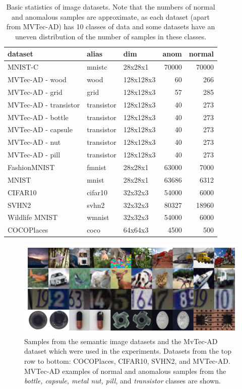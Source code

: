 \begin{table}
    \centering
    \tabcolsep=0.1cm
    \begin{tabular}{lllrr}
    \toprule
    \textbf{dataset} & \textbf{alias} & \textbf{dim} & \textbf{anom} & \textbf{normal} \\
    \midrule
    MNIST-C & mnistc & 28x28x1 & 70000 & 70000 \\
    MVTec-AD - wood & wood & 128x128x3 & 60 & 266 \\
    MVTec-AD - grid & grid & 128x128x3 & 57 & 285 \\
    MVTec-AD - transistor & transistor & 128x128x3 & 40 & 273 \\
    MVTec-AD - bottle & transistor & 128x128x3 & 40 & 273 \\
    MVTec-AD - capsule & transistor & 128x128x3 & 40 & 273 \\
    MVTec-AD - nut & transistor & 128x128x3 & 40 & 273 \\
    MVTec-AD - pill & transistor & 128x128x3 & 40 & 273 \\
    FashionMNIST & fmnist & 28x28x1 & 63000 & 7000   \\
    MNIST & mnist & 28x28x1 & 63686 & 6312  \\
    CIFAR10 & cifar10 & 32x32x3 & 54000 & 6000  \\
    SVHN2 & svhn2 & 32x32x3 & 80327 & 18960  \\
    Wildlife MNIST & wmnist & 32x32x3 & 54000 & 6000  \\
    COCOPlaces & coco & 64x64x3 & 4500 & 500  \\\bottomrule
    \end{tabular}
    \vspace*{0.15cm}
    \caption{Basic statistics of image datasets. Note that the numbers of normal and anomalous samples are approximate, as each dataset (apart from MVTec-AD) has 10 classes of data and some datasets have an uneven distribution of the number of samples in these classes.}
    \label{tab:image_datasets}
\end{table}
    

\begin{figure}
    \centering
    \includegraphics[width=\textwidth]{data/chapter_sgvaegan/fig5_all_grid.png}
    \caption{Samples from the semantic image datasets and the MvTec-AD dataset which were used in the experiments. Datasets from the top row to bottom: COCOPlaces, CIFAR10, SVHN2, and MVTec-AD. MVTec-AD examples of normal and anomalous samples from the \textit{bottle, capsule, metal nut, pill}, and \textit{transistor} classes are shown.}
    \label{fig:all_grid}
\end{figure}
